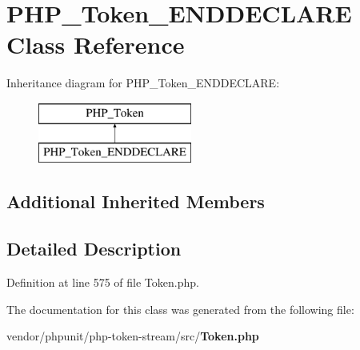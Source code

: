 \section{P\+H\+P\+\_\+\+Token\+\_\+\+E\+N\+D\+D\+E\+C\+L\+A\+R\+E Class Reference}
\label{class_p_h_p___token___e_n_d_d_e_c_l_a_r_e}
Inheritance diagram for P\+H\+P\+\_\+\+Token\+\_\+\+E\+N\+D\+D\+E\+C\+L\+A\+R\+E\+:\begin{figure}[H]
\begin{center}
\leavevmode
\includegraphics[height=2.000000cm]{class_p_h_p___token___e_n_d_d_e_c_l_a_r_e}
\end{center}
\end{figure}
\subsection*{Additional Inherited Members}


\subsection{Detailed Description}


Definition at line 575 of file Token.\+php.



The documentation for this class was generated from the following file\+:\begin{DoxyCompactItemize}
\item 
vendor/phpunit/php-\/token-\/stream/src/{\bf Token.\+php}\end{DoxyCompactItemize}
